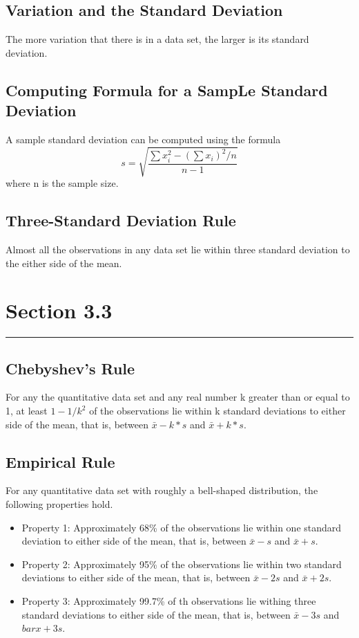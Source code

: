 \documentclass[12pt]{article}
\begin{document}
        \subsection*{Variation and the Standard Deviation}
                The more variation that there is in a data set, the larger is its standard deviation.
        \subsection*{Computing Formula for a SampLe Standard Deviation}
            A sample standard deviation can be computed using the formula
            \begin{equation}
                s = \sqrt{\frac{\sum{x_i^2}-(\sum{x_i})^2/n}{n-1}}                     
            \end{equation}
            where n is the sample size.
        \subsection*{Three-Standard Deviation Rule}
            Almost all the observations in any data set lie within three standard deviation to the
            either side of the mean.
    \section*{Section 3.3}
    \noindent\rule{\textwidth}{0.4pt}
        \subsection*{Chebyshev's Rule}
            For any the quantitative data set and any real number k greater than or equal to 1, at
            least \(1-1/k^2\) of the observations lie within k standard deviations to either side of
            the mean, that is, between \(\bar{x}-k*s\) and \(\bar{x}+k*s\).
        \subsection*{Empirical Rule}
        For any quantitative data set with roughly a bell-shaped distribution, the following
        properties hold.
        \begin{itemize}
            \item{Property 1:} Approximately 68\% of the observations lie within one standard 
            deviation to either side of the mean, that is, between \(\bar{x}-s\) and \(\bar{x}+s\).
            \item{Property 2:} Approximately 95\% of the observations lie within two standard
            deviations to either side of the mean, that is, between \(\bar{x}-2s\) and \(\bar{x}+2s\).
            \item{Property 3:} Approximately 99.7\% of th observations lie withing three standard
            deviations to either side of the mean, that is, between \(\bar{x}-3s\) and \(bar{x}+3s\).
        \end{itemize}
\end{document}
